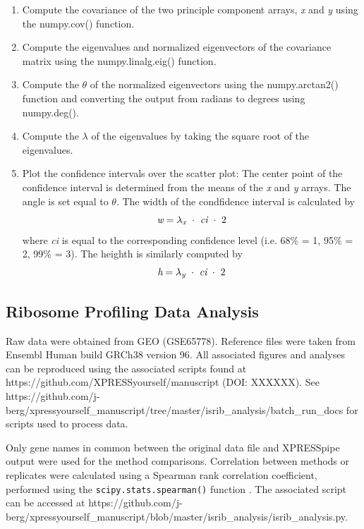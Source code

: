 \documentclass[11pt, a4paper, oneside]{article}
\begin{document}
\begin{enumerate}
  \item Compute the covariance of the two principle component arrays, \textit{x} and \textit{y} using the numpy.cov() function.

  \item Compute the eigenvalues and normalized eigenvectors of the covariance matrix using the numpy.linalg.eig() function.

  \item Compute the $\theta$ of the normalized eigenvectors using the numpy.arctan2() function and converting the output from radians to degrees using numpy.deg().

  \item Compute the $\lambda$ of the eigenvalues by taking the square root of the eigenvalues.

  \item Plot the confidence intervals over the scatter plot: The center point of the confidence interval is determined from the means of the \textit{x} and \textit{y} arrays. The angle is set equal to $\theta$. The width of the condfidence interval is calculated by
  \[
  \textit{w} = \lambda _{\textit{\scriptsize{x}}}\ \cdot\ \textit{ci}\ \cdot\ 2
  \]
  where \textit{ci} is equal to the corresponding confidence level (i.e. 68\% = 1, 95\% = 2, 99\% = 3). The heighth is similarly computed by
  \[
  \textit{h} = \lambda _{\textit{\scriptsize{y}}}\ \cdot\ \textit{ci}\ \cdot\ 2
  \]
\end{enumerate}

\subsection{Ribosome Profiling Data Analysis}
Raw data were obtained from GEO (GSE65778). Reference files were taken from Ensembl Human build GRCh38 version 96. All associated figures and analyses can be reproduced using the associated scripts found at https://github.com/XPRESSyourself/manuscript (DOI: XXXXXX). See https://github.com/j-berg/xpressyourself\_manuscript/tree/master/isrib\_analysis/batch\_run\_docs for scripts used to process data. \par

Only gene names in common between the original data file and XPRESSpipe output were used for the method comparisons. Correlation between methods or replicates were calculated using a Spearman rank correlation coefficient, performed using the \texttt{scipy.stats.spearman()} function \cite{spearman_rnaseq}. The associated script can be accessed at https://github.com/j-berg/xpressyourself\_manuscript/blob/master/isrib\_analysis/isrib\_analysis.py. \par
\end{document}

